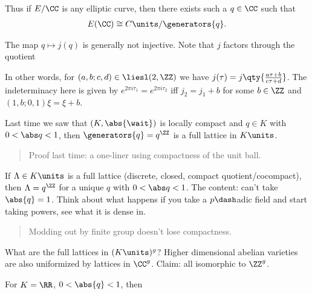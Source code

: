 Thus if \(E/\CC\) is any elliptic curve, then there exists such a
\(q\in \CC\) such that
\begin{align*}
E(\CC) \cong C\units/\generators{q}
.\end{align*}

\begin{remark}

The map \(q \mapsto j(q)\) is generally not injective. Note that \(j\)
factors through the quotient

\begin{center}\end{center}

In other words, for \((a, b; c, d) \in \liesl(2, \ZZ)\) we have
\(j(\tau) = j\qty{\frac{a\tau + b}{c\tau + d}}\). The indeterminacy here
is given by \(e^{2\pi i \tau_1} = e^{2\pi i \tau_2}\) iff
\(j_2 = j_1 + b\) for some \(b\in \ZZ\) and
\((1, b; 0, 1) \xi = \xi + b\).

\end{remark}

Last time we saw that \((K, \abs{\wait})\) is locally compact and
\(q\in K\) with \(0< \abs q < 1\), then \(\generators{q} = q^\ZZ\) is a
full lattice in \(K\units\).

\begin{quote}
Proof last time: a one-liner using compactness of the unit ball.
\end{quote}

\begin{description}
\tightlist
\item[Exercise]
If \(\Lambda \in K\units\) is a full lattice (discrete, closed, compact
quotient/cocompact), then \(\Lambda = q^\ZZ\) for a unique \(q\) with
\(0 < \abs q < 1\). The content: can't take \(\abs{q} = 1\). Think about
what happens if you take a \(p\dash\)adic field and start taking powers,
see what it is dense in.
\end{description}

\begin{quote}
Modding out by finite group doesn't lose compactness.
\end{quote}

\begin{description}
\tightlist
\item[Exercise]
What are the full lattices in \((K\units)^g\)? Higher dimensional
abelian varieties are also uniformized by lattices in \(\CC^g\). Claim:
all isomorphic to \(\ZZ^g\).
\item[Exercise]
For \(K = \RR\), \(0 < \abs{q} < 1\), then
\end{description}

